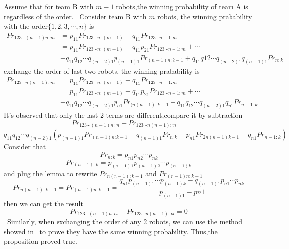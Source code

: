 \documentclass{article} %
\begin{document}
     Assume that for team B with $m-1$ robots,the winning probability of team A is regardless of the order. \textbf{}\ Consider team B with $m$ robots, the winning prabability with the order$ \{1,2,3,\cdots,n\}$ is
      \begin{equation}
     \begin{aligned}
     Pr_{123\cdots (n-1)n:m}&=p_{11}Pr_{123\cdots n:(m-1)}+q_{11}Pr_{123\cdots n-1:m}\\
     &=p_{11}Pr_{123\cdots n:(m-1)}+q_{11}p_{21}Pr_{123\cdots n-1:m}+\cdots\\&+q_{11}q_{12}\cdots q_{(n-2)1}p_{(n-1)1}Pr_{(n-1)n:k-1}+q_{11}q{12}\cdots q_{(n-2)1}q_{(n-1)1}Pr_{n:k}
     \end{aligned}
     \end{equation}
     exchange the order of last two robots, the winning prabability is
     \begin{equation}
     \begin{aligned}
     Pr_{123\cdots n(n-1):m}&=p_{11}Pr_{123\cdots n:(m-1)}+q_{11}Pr_{123\cdots n-1:m}\\
     &=p_{11}Pr_{123\cdots n:(m-1)}+q_{11}p_{21}Pr_{123\cdots n-1:m}+\cdots\\&+q_{11}q_{12}\cdots q_{(n-2)1}p_{n1}Pr_{(n(n-1):k-1}+q_{11}q_{12}\cdots q_{(n-2)1}q_{n1}Pr_{n-1:k}
     \end{aligned}
     \end{equation}
    It's observed that only the last 2 terms are different,compare it by subtraction
    $$
    Pr_{123\cdots (n-1)n:m}-Pr_{123\cdots n(n-1):m}=
    $$
    $$
    q_{11}q_{12}\cdots q_{(n-2)1}(p_{(n-1)1}Pr_{(n-1)n:k-1}+q_{(n-1)1}Pr_{n:k}-p_{n1}Pr_{2n(n-1)k-1}-q_{n1}Pr_{n-1:k})
    $$
    Consider that
    $$
    Pr_{n:k}=p_{n1}p_{n2}\cdots p_{nk}
    $$
    $$
    Pr_{(n-1):k}=p_{(n-1)1}p_{(n-1)2}\cdots p_{(n-1)k}
	$$
	and plug the lemma to rewrite $Pr_{n(n-1):k-1}$ and $Pr_{(n-1)n:k-1}$
	$$
	Pr_{n(n-1):k-1}=Pr_{(n-1)n:k-1}=
	\frac{q_{n1}p_{(n-1)1}\cdots p_{(n-1)k}-q_{(n-1)1}p_{n1}\cdots p_{nk}}{p_{(n-1)1}-p{n1}}
	$$
	then we can get the result
	$$
	Pr_{123\cdots (n-1)n:m}-Pr_{123\cdots n(n-1):m}=0
	$$
	\textbf{}\ Similarly, when exchanging the order of any 2 robots, we can use the method showed in \textbf{} \ to prove they have the same winning probability. Thus,the proposition proved true.
\end{document}

